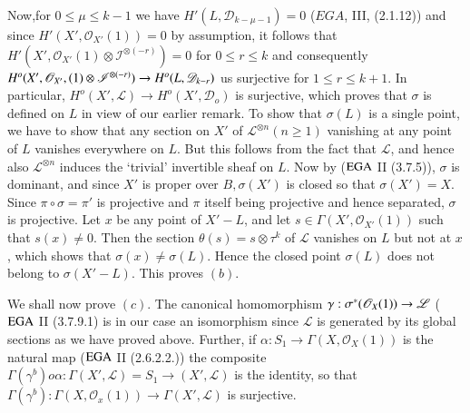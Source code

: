 Now,\pageoriginale  for $0\leq\mu\leq k-1$ we have
$H'(L,\mathscr{D}_{k-\mu -1}) = 0$ 
($EGA$, III, (2.1.12))  and since $H'(X',\mathscr{O}_{X'}(1)) = 0$ by
assumption, it follows that
$H'(X',\mathscr{O}_{X'}(1)\otimes\mathscr{I}^{\otimes(-r)}) = 0$ for
$0\leq r \leq k$ and consequently
$H^o(X',\mathscr{O}_{X'},\break (1)\otimes\mathscr{I}^{\otimes(-r)})
\rightarrow H^o(L,\mathscr{D}_{k-r})$ us surjective for $1 \leq r \leq
k+1$. In particular, $H^o(X',\mathscr{L})\rightarrow
H^o(X',\mathscr{D}_o)$ is surjective, which proves that $\sigma$ is
defined on $L$ in view of our earlier remark. To show that $\sigma(L)$
is a single point, we have to show that any section on $X'$ of
$\mathscr{L}^{\otimes n} (n\geq 1)$ vanishing at any point of $L$
vanishes everywhere on $L$. But this follows from the fact that
$\mathscr{L}$, and hence also $\mathscr{L}^{\otimes n}$ induces the
`trivial' invertible sheaf on $L$. Now by ($\operatorname{EGA}$ II (3.7.5)),
$\sigma$ is dominant, and since $X'$ is proper over $B,\sigma(X')$ is
closed so that $\sigma(X') = X$. Since $\pi \circ \sigma = \pi'$ is
projective and $\pi$ itself being projective and hence separated,
$\sigma$ is projective. Let $x$ be any point of $X' - L$, and let $s
\in \Gamma(X',\mathscr{O}_{X'}(1))$ such that $s(x) \neq 0$. Then the
section $\theta (s) = s \otimes \tau^{k}$ of $\mathscr{L}$ vanishes on
$L$ but not at $x$, which shows that $\sigma(x) \neq \sigma(L)$. Hence
the closed point $\sigma(L)$ does not belong to $\sigma(X' -L)$. This
proves $(b)$. 

We shall now prove $(c)$. The canonical homomorphism $\gamma:\break
\sigma^* (\mathscr{O}_X(1)) \rightarrow\mathscr{L}$ ($\operatorname{EGA}$ II
(3.7.9.1) is in our case an isomorphism since $\mathscr{L}$ is
generated by its global sections as we have proved above. Further, if
$\alpha : S_1 \rightarrow \Gamma (X,\mathscr{O}_X (1))$ is the natural
map ($\operatorname{EGA}$ II (2.6.2.2.)) the composite $\Gamma(\gamma^{b}) o \alpha
: \Gamma(X',\mathscr{L}) = S_1 \rightarrow (X',\mathscr{L})$ is the
identity, so that $\Gamma(\gamma^b):\Gamma(X,\mathscr{O}_x(1))
\rightarrow \Gamma(X',\mathscr{L})$ is surjective.\pageoriginale 

